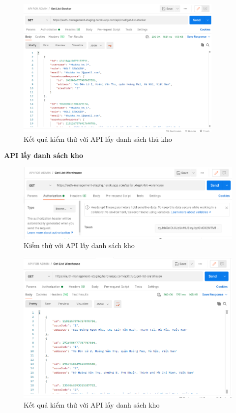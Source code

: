 		\begin{figure}[H]
			\includegraphics[width=0.9\textwidth]{Images/testing/API-get-list-stocker-result.png}
			\centering
			\linebreak
			\caption{Kết quả kiểm thử với API lấy danh sách thủ kho}
		\end{figure}
		
		\newpage
		\textbf{API lấy danh sách kho}
		
		\begin{figure}[H]
			\includegraphics[width=1\textwidth]{Images/testing/API-get-list-warehouse.png}
			\centering
			\linebreak
			\caption{Kiểm thử với API lấy danh sách kho}
		\end{figure}
		
		\begin{figure}[H]
			\includegraphics[width=1\textwidth]{Images/testing/API-get-list-warehouse-result.png}
			\centering
			\linebreak
			\caption{Kết quả kiểm thử với API lấy danh sách kho}
		\end{figure}
		
